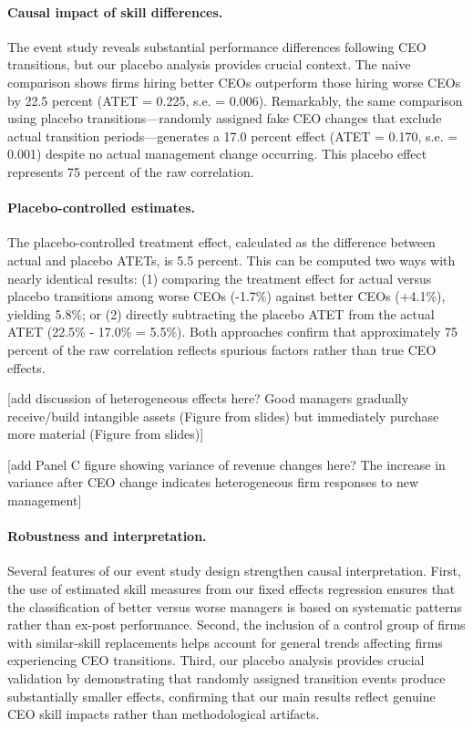 \documentclass[11pt,a4paper]{article}
\begin{document}
\paragraph{Causal impact of skill differences.} The event study reveals substantial performance differences following CEO transitions, but our placebo analysis provides crucial context. The naive comparison shows firms hiring better CEOs outperform those hiring worse CEOs by 22.5 percent (ATET = 0.225, s.e. = 0.006). Remarkably, the same comparison using placebo transitions---randomly assigned fake CEO changes that exclude actual transition periods---generates a 17.0 percent effect (ATET = 0.170, s.e. = 0.001) despite no actual management change occurring. This placebo effect represents 75 percent of the raw correlation.

\paragraph{Placebo-controlled estimates.} The placebo-controlled treatment effect, calculated as the difference between actual and placebo ATETs, is 5.5 percent. This can be computed two ways with nearly identical results: (1) comparing the treatment effect for actual versus placebo transitions among worse CEOs (-1.7\%) against better CEOs (+4.1\%), yielding 5.8\%; or (2) directly subtracting the placebo ATET from the actual ATET (22.5\% - 17.0\% = 5.5\%). Both approaches confirm that approximately 75 percent of the raw correlation reflects spurious factors rather than true CEO effects.


[add discussion of heterogeneous effects here? Good managers gradually receive/build intangible assets (Figure from slides) but immediately purchase more material (Figure from slides)]

[add Panel C figure showing variance of revenue changes here? The increase in variance after CEO change indicates heterogeneous firm responses to new management] 

\paragraph{Robustness and interpretation.} Several features of our event study design strengthen causal interpretation. First, the use of estimated skill measures from our fixed effects regression ensures that the classification of better versus worse managers is based on systematic patterns rather than ex-post performance. Second, the inclusion of a control group of firms with similar-skill replacements helps account for general trends affecting firms experiencing CEO transitions. Third, our placebo analysis provides crucial validation by demonstrating that randomly assigned transition events produce substantially smaller effects, confirming that our main results reflect genuine CEO skill impacts rather than methodological artifacts.
\end{document}
